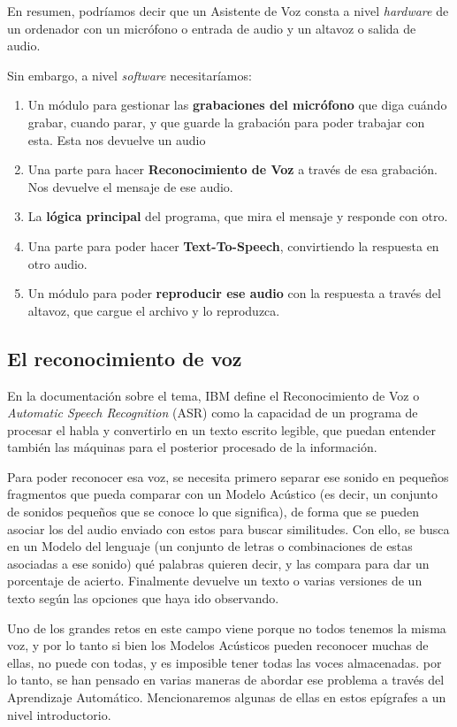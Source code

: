 En resumen, podríamos decir que un Asistente de Voz consta a nivel \textit{hardware} de un ordenador con un micrófono o entrada de audio y un altavoz o salida de audio.

Sin embargo, a nivel \textit{software} necesitaríamos:
\begin{enumerate}
	\item Un módulo para gestionar las \textbf{grabaciones del micrófono} que diga cuándo grabar, cuando parar, y que guarde la grabación para poder trabajar con esta. Esta nos devuelve un audio
	\item Una parte para hacer \textbf{Reconocimiento de Voz} a través de esa grabación. Nos devuelve el mensaje de ese audio.
	\item La \textbf{lógica principal} del programa, que mira el mensaje y responde con otro.
	\item Una parte para poder hacer \textbf{Text-To-Speech}, convirtiendo la respuesta en otro audio.
	\item Un módulo para poder \textbf{reproducir ese audio} con la respuesta a través del altavoz, que cargue el archivo y lo reproduzca.
\end{enumerate}

\subsection{El reconocimiento de voz}
En la documentación sobre el tema, IBM \cite{sr-definition} define el Reconocimiento de Voz o \textit{Automatic Speech Recognition} (ASR) como la capacidad de un programa de procesar el habla y convertirlo en un texto escrito legible, que puedan entender también las máquinas para el posterior procesado de la información.

Para poder reconocer esa voz, se necesita primero separar ese sonido en pequeños fragmentos que pueda comparar con un Modelo Acústico (es decir, un conjunto de sonidos pequeños que se conoce lo que significa), de forma que se pueden asociar los del audio enviado con estos para buscar similitudes. Con ello, se busca en un Modelo del lenguaje (un conjunto de letras o combinaciones de estas asociadas a ese sonido) qué palabras quieren decir, y las compara para dar un porcentaje de acierto. Finalmente devuelve un texto o varias versiones de un texto según las opciones que haya ido observando.

Uno de los grandes retos en este campo viene porque no todos tenemos la misma voz, y por lo tanto si bien los Modelos Acústicos pueden reconocer muchas de ellas, no puede con todas, y es imposible tener todas las voces almacenadas. por lo tanto, se han pensado en varias maneras de abordar ese problema a través del Aprendizaje Automático. Mencionaremos algunas de ellas en estos epígrafes a un nivel introductorio. \cite{sr-methods}

